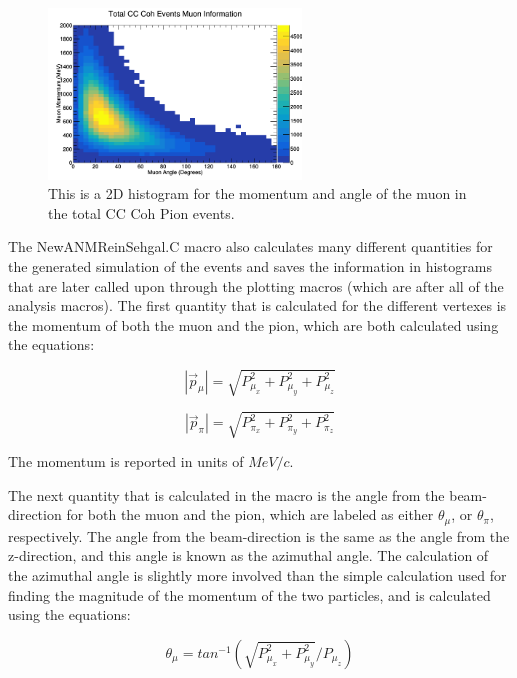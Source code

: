 \documentclass[11pt]{article}
\begin{document}
\begin{figure}[H]
\centering
\includegraphics[width=0.6\textwidth]{NewANMReinSehgalImages/9-TotalCCCohMuonInfoANMRS.png}
\caption{This is a 2D histogram for the momentum and angle of the muon in the total CC Coh Pion events.}
\end{figure}

The NewANMReinSehgal.C macro also calculates many different quantities for the generated simulation of the events and saves the information in histograms that are later called upon through the plotting macros (which are after all of the analysis macros). The first quantity that is calculated for the different vertexes is the momentum of both the muon and the pion, which are both calculated using the equations:

\begin{equation}
|\vec{p}_\mu| = \sqrt{P_{\mu_x}^2 + P_{\mu_y}^2 + P_{\mu_z}^2}
\end{equation}

\begin{equation}
|\vec{p}_\pi| = \sqrt{P_{\pi_x}^2 + P_{\pi_y}^2 + P_{\pi_z}^2}
\end{equation}

\noindent
The momentum is reported in units of $MeV/c$.

The next quantity that is calculated in the macro is the angle from the beam-direction for both the muon and the pion, which are labeled as either $\theta_\mu$, or $\theta_\pi$, respectively. The angle from the beam-direction is the same as the angle from the z-direction, and this angle is known as the azimuthal angle. The calculation of the azimuthal angle is slightly more involved than the simple calculation used for finding the magnitude of the momentum of the two particles, and is calculated using the equations:

\begin{equation}
\theta_\mu = tan^{-1}(\sqrt{P_{\mu_x}^2 + P_{\mu_y}^2}/{P_{\mu_z}})
\end{equation}
\end{document}
